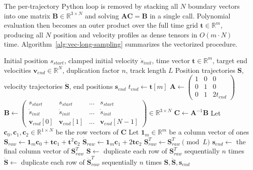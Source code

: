 The per-trajectory Python loop is removed by stacking all $N$ boundary vectors into one matrix $\mathbf{B} \in \mathbb{R}^{3 \times N}$ and solving $\mathbf{A}\mathbf{C}=\mathbf{B}$ in a single call.
Polynomial evaluation then becomes an outer product over the full time grid $\mathbf{t} \in \mathbb{R}^{m}$, producing all $N$ position and velocity profiles as dense tensors in $O(m \cdot N)$ time.
Algorithm~\ref{alg:vec-long-sampling} summarizes the vectorized procedure.

\begin{algorithm}[htbp]
\caption{Vectorized Longitudinal Sampling}
\label{alg:vec-long-sampling}
\begin{algorithmic}[1]
\Require Initial position $s_{start}$, clamped initial velocity $\dot{s}_{init}$, time vector $\mathbf{t} \in \mathbb{R}^{m}$, target end velocities $\mathbf{v}_{end} \in \mathbb{R}^{N}$, duplication factor $n$, track length $L$
\Ensure Position trajectories $\mathbf{S}$, velocity trajectories $\dot{\mathbf{S}}$, end positions $\mathbf{s}_{end}$
\State $t_{end} \gets \mathbf{t}[m]$ 
\State $\mathbf{A} \gets \begin{pmatrix} 1 & 0 & 0 \\ 0 & 1 & 0 \\ 0 & 1 & 2 t_{end} \end{pmatrix}$
\State $\mathbf{B} \gets \begin{pmatrix} s_{start} & s_{start} & \dots & s_{start} \\ \dot{s}_{init} & \dot{s}_{init} & \dots & \dot{s}_{init} \\ \mathbf{v}_{end}[0] & \mathbf{v}_{end}[1] & \dots & \mathbf{v}_{end} [N-1] \end{pmatrix} \in \mathbb{R}^{3 \times N}$ 
\State $\mathbf{C} \gets \mathbf{A}^{-1} \mathbf{B}$ 
\State Let $\mathbf{c}_0, \mathbf{c}_1, \mathbf{c}_2 \in \mathbb{R}^{1 \times N}$ be the row vectors of $\mathbf{C}$
\State Let $\mathbf{1}_{m} \in \mathbb{R}^{m}$ be a column vector of ones
\State $\mathbf{S}_{raw} \gets \mathbf{1}_m \mathbf{c}_0 + \mathbf{t} \mathbf{c}_1 + \mathbf{t}^2 \mathbf{c}_2$ 
\State $\dot{\mathbf{S}}_{raw} \gets \mathbf{1}_m \mathbf{c}_1 + 2\mathbf{t} \mathbf{c}_2$
\State $\mathbf{S}_{raw}^T \gets \mathbf{S}_{raw}^T \pmod{L}$ 
\State $\mathbf{s}_{end} \gets$ the final column vector of $\mathbf{S}_{raw}^T$
\State $\mathbf{S} \gets$ duplicate each row of $\mathbf{S}_{raw}^T$ sequentially $n$ times
\State $\dot{\mathbf{S}} \gets$ duplicate each row of $\dot{\mathbf{S}}_{raw}^T$ sequentially $n$ times
\State \Return $\mathbf{S}, \dot{\mathbf{S}}, \mathbf{s}_{end}$
\end{algorithmic}
\end{algorithm}


